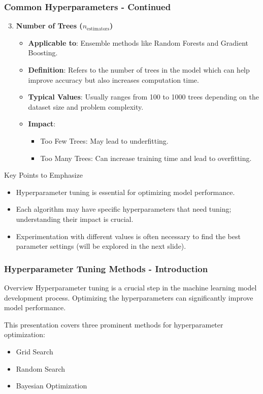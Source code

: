 \documentclass[aspectratio=169]{beamer}
\begin{document}
\begin{frame}[fragile]
    \frametitle{Common Hyperparameters - Continued}
    \begin{enumerate}
        \setcounter{enumi}{2} %
        \item \textbf{Number of Trees ($n_{\text{estimators}}$)}
        \begin{itemize}
            \item \textbf{Applicable to}: Ensemble methods like Random Forests and Gradient Boosting.
            \item \textbf{Definition}: Refers to the number of trees in the model which can help improve accuracy but also increases computation time.
            \item \textbf{Typical Values}: Usually ranges from 100 to 1000 trees depending on the dataset size and problem complexity.
            \item \textbf{Impact}:
            \begin{itemize}
                \item Too Few Trees: May lead to underfitting.
                \item Too Many Trees: Can increase training time and lead to overfitting.
            \end{itemize}
        \end{itemize}
    \end{enumerate}
    \begin{block}{Key Points to Emphasize}
        \begin{itemize}
            \item Hyperparameter tuning is essential for optimizing model performance.
            \item Each algorithm may have specific hyperparameters that need tuning; understanding their impact is crucial.
            \item Experimentation with different values is often necessary to find the best parameter settings (will be explored in the next slide).
        \end{itemize}
    \end{block}
\end{frame}

\begin{frame}[fragile]
    \frametitle{Hyperparameter Tuning Methods - Introduction}
    \begin{block}{Overview}
        Hyperparameter tuning is a crucial step in the machine learning model development process. Optimizing the hyperparameters can significantly improve model performance.
    \end{block}
    This presentation covers three prominent methods for hyperparameter optimization:
    \begin{itemize}
        \item Grid Search
        \item Random Search
        \item Bayesian Optimization
    \end{itemize}
\end{frame}
\end{document}
